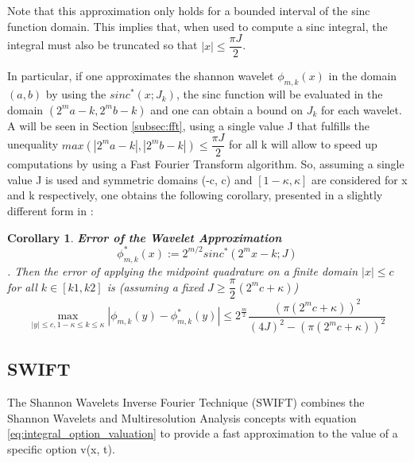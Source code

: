 \documentclass[12,twoside]{mammeTFM}
\newtheorem{cor}[thm]{Corollary}
\theoremstyle{definition}
\theoremstyle{remark}
\begin{document}
Note that this approximation only holds for a bounded interval of the sinc function domain. This implies that, when used to compute a sinc integral, the integral must also be truncated so that $|x| \leq \dfrac{\pi J}{2}$.

In particular, if one approximates the shannon wavelet $\phi_{m,k}(x)$ in the domain $(a, b)$ by using the $sinc^{*}(x;J_k)$, the sinc function will be evaluated in the domain $(2^m a - k, 2^m b - k)$ and one can obtain a bound on $J_k$ for each wavelet. A will be seen in Section \ref{subsec:fft}, using a single value J that fulfills the unequality $max(|2^m a - k|, |2^m b - k|) \leq \dfrac{\pi J}{2}$ for all k will allow to speed up computations by using a Fast Fourier Transform algorithm. So, assuming a single value J is used and symmetric domains (-c, c) and $[1 - \kappa, \kappa]$ are considered for x and k respectively, one obtains the following corollary, presented in a slightly different form in \cite{mar17}:
\begin{cor} \textbf{Error of the Wavelet Approximation}
\begin{equation}
\phi_{m,k}^{*}(x) := 2^{m/2} sinc^{*}(2^m x -k; J)
\end{equation}
. Then the error of applying the midpoint quadrature on a finite domain $|x| \leq c$ for all $k \in [k1, k2]$ is (assuming a fixed $J \geq \dfrac{\pi}{2}(2^m c + \kappa)$) 
\begin{equation}
\max _{|y| \leq c, 1-\kappa \leq k \leq \kappa}\left|\phi_{m, k}(y)-\phi_{m, k}^{*}(y)\right| \leq 2^{\frac{m}{2}} \frac{\left(\pi\left(2^{m} c+\kappa\right)\right)^{2}}{(4 J)^{2}-\left(\pi\left(2^{m} c+\kappa\right)\right)^{2}}
\end{equation}
\end{cor}


\subsection{SWIFT} \label{chapter:swift}

The Shannon Wavelets Inverse Fourier Technique (SWIFT) combines the Shannon Wavelets and Multiresolution Analysis concepts with equation \ref{eq:integral_option_valuation} to provide a fast approximation to the value of a specific option v(x, t).
\end{document}
